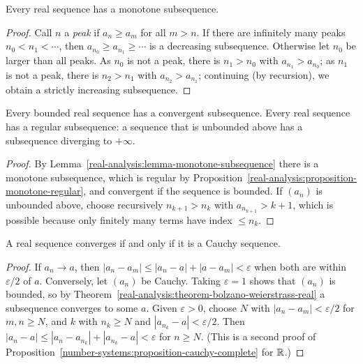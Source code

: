 \begin{lemma}\label{real-analysis:lemma-monotone-subsequence}
Every real sequence has a monotone subsequence.
\end{lemma}

\begin{proof}
Call $n$ a \emph{peak} if $a_n \geq a_m$ for all $m > n$. If there are infinitely many peaks $n_0 < n_1 < \cdots$, then $a_{n_0} \geq a_{n_1} \geq \cdots$ is a decreasing subsequence. Otherwise let $n_0$ be larger than
all peaks. As $n_0$ is not a peak, there is $n_1 > n_0$ with $a_{n_1} > a_{n_0}$; as $n_1$ is not a peak, there is $n_2 > n_1$ with $a_{n_2} > a_{n_1}$; continuing (by recursion), we obtain a strictly increasing
subsequence.
\end{proof}

\begin{theorem}\label{real-analysis:theorem-bolzano-weierstrass-real}
Every bounded real sequence has a convergent subsequence. Every real sequence has a regular subsequence: a sequence that is unbounded above has a subsequence diverging to $+\infty$.
\end{theorem}

\begin{proof}
By Lemma~\ref{real-analysis:lemma-monotone-subsequence} there is a monotone subsequence, which is regular by Proposition~\ref{real-analysis:proposition-monotone-regular}, and convergent if the sequence is
bounded. If $(a_n)$ is unbounded above, choose recursively $n_{k+1} > n_k$ with $a_{n_{k+1}} > k + 1$, which is possible because only finitely many terms have index $\leq n_k$.
\end{proof}

\begin{theorem}\label{real-analysis:theorem-cauchy-criterion}
A real sequence converges if and only if it is a Cauchy sequence.
\end{theorem}

\begin{proof}
If $a_n \to a$, then $|a_n - a_m| \leq |a_n - a| + |a - a_m| < \varepsilon$ when both are within $\varepsilon/2$ of $a$. Conversely, let $(a_n)$ be Cauchy. Taking $\varepsilon = 1$ shows that $(a_n)$ is bounded,
so by Theorem~\ref{real-analysis:theorem-bolzano-weierstrass-real} a subsequence converges to some $a$. Given $\varepsilon > 0$, choose $N$ with $|a_n - a_m| < \varepsilon/2$ for $m, n \geq N$, and $k$ with $n_k \geq N$
and $|a_{n_k} - a| < \varepsilon/2$. Then $|a_n - a| \leq |a_n - a_{n_k}| + |a_{n_k} - a| < \varepsilon$ for $n \geq N$. (This is a second proof of
Proposition~\ref{number-systems:proposition-cauchy-complete} for $\mathbb{R}$.)
\end{proof}

